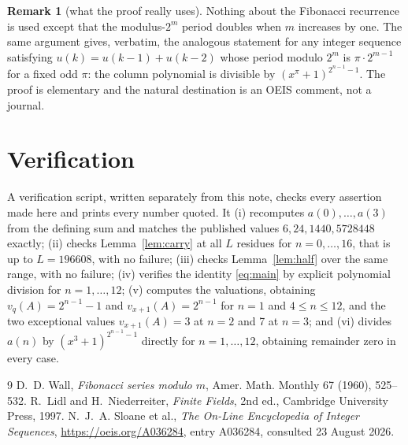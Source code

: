 \documentclass[11pt,a4paper]{article}
\theoremstyle{plain}
\theoremstyle{definition}
\newtheorem*{remark}{Remark}
\begin{document}
\begin{remark}[what the proof really uses]
Nothing about the Fibonacci recurrence is used except that the modulus-$2^{m}$ period
doubles when $m$ increases by one. The same argument gives, verbatim, the analogous
statement for any integer sequence satisfying $u(k)=u(k-1)+u(k-2)$ whose period modulo
$2^{m}$ is $\pi\cdot2^{m-1}$ for a fixed odd $\pi$: the column polynomial is divisible by
$(x^{\pi}+1)^{2^{n-1}-1}$. The proof is elementary and the natural destination is an OEIS
comment, not a journal.
\end{remark}

\section{Verification}

A verification script, written separately from this note, checks every assertion made here
and prints every number quoted. It (i) recomputes $a(0),\dots,a(3)$ from the defining sum
and matches the published values $6,24,1440,5728448$ exactly; (ii) checks
Lemma~\ref{lem:carry} at all $L$ residues for $n=0,\dots,16$, that is up to $L=196608$,
with no failure; (iii) checks Lemma~\ref{lem:half} over the same range, with no failure;
(iv) verifies the identity \eqref{eq:main} by explicit polynomial division for
$n=1,\dots,12$; (v) computes the valuations, obtaining $v_{q}(A)=2^{n-1}-1$ and
$v_{x+1}(A)=2^{n-1}$ for $n=1$ and $4\le n\le12$, and the two exceptional values
$v_{x+1}(A)=3$ at $n=2$ and 7 at $n=3$; and (vi) divides $a(n)$ by $(x^{3}+1)^{2^{n-1}-1}$
directly for $n=1,\dots,12$, obtaining remainder zero in every case.

\begin{thebibliography}{9}
 D.~D. Wall, \emph{Fibonacci series modulo $m$}, Amer. Math. Monthly 67
(1960), 525--532.
 R.~Lidl and H.~Niederreiter, \emph{Finite Fields}, 2nd ed., Cambridge
University Press, 1997.
 N.~J.~A. Sloane et al., \emph{The On-Line Encyclopedia of Integer
Sequences}, \url{https://oeis.org/A036284}, entry A036284, consulted 23 August 2026.
\end{thebibliography}
\end{document}
